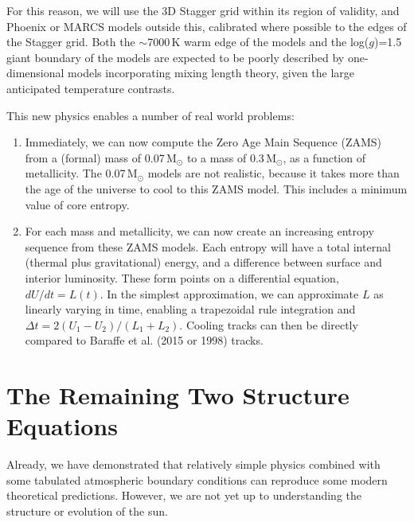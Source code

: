 \documentclass[12pt]{article}
\begin{document}
For this reason, we will use the 3D Stagger grid within its region of validity, and Phoenix or MARCS models outside this, calibrated where possible to the edges of the Stagger grid. Both the $\sim$7000\,K warm edge of the models and the log($g$)=1.5 giant boundary of the models are expected to be poorly described by one-dimensional models incorporating mixing length theory, given the large anticipated temperature contrasts.

This new physics enables a number of real world problems:

\begin{enumerate}
\item Immediately, we can now compute the Zero Age Main Sequence (ZAMS) from a (formal) mass of 0.07\,M$_\odot$ to a mass of 0.3\,M$_\odot$, as a function of metallicity. The 0.07\,M$_\odot$ models are not realistic, because it takes more than the age of the universe to cool to this ZAMS model. This includes a minimum value of core entropy. 
\item For each mass and metallicity, we can now create an increasing entropy sequence from these ZAMS models. Each entropy will have a total internal (thermal plus gravitational) energy, and a difference between surface and interior luminosity. These form points on a differential equation, $dU/dt = L(t)$. In the simplest approximation, we can approximate $L$ as linearly varying in time, enabling a trapezoidal rule integration and $\Delta t = 2(U_1 - U_2)/(L_1 + L_2)$. Cooling tracks can then be directly compared to Baraffe et al. (2015 or 1998) tracks.
\end{enumerate}

\section{The Remaining Two Structure Equations}

Already, we have demonstrated that relatively simple physics combined with some tabulated atmospheric boundary conditions can reproduce some modern theoretical predictions. However, we are not yet up to understanding the structure or evolution of the sun.
\end{document}
